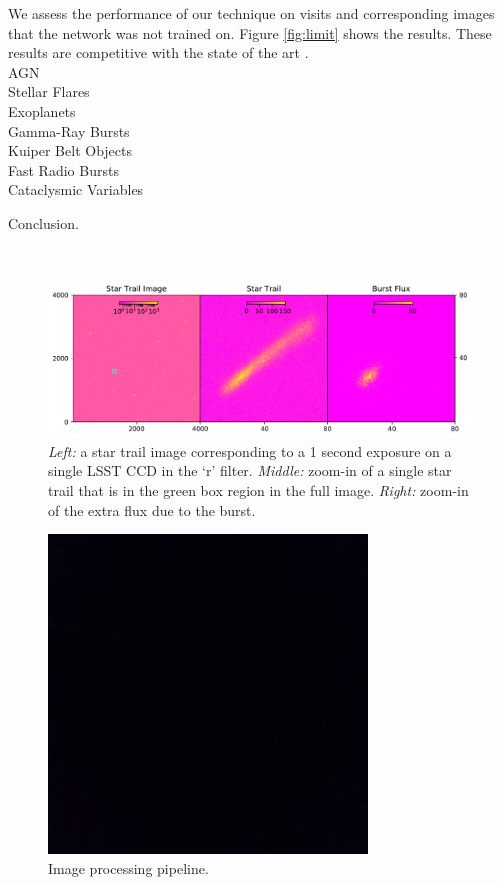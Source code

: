 \documentclass[12pt, letterpaper]{article}
\begin{document}
We assess the performance of our technique on visits and corresponding images that the network was not trained on. Figure \ref{fig:limit} shows the results. These results are competitive with the state of the art \citep{2016SPIE.9908E..0YD}. 
\\

{\color{green}
\noindent AGN\\
Stellar Flares\\
Exoplanets\\
Gamma-Ray Bursts\\
Kuiper Belt Objects\\
Fast Radio Bursts\\
Cataclysmic Variables\\
}

Conclusion.

\
\begin{figure}[htb]
\center
\includegraphics[width=1.00\columnwidth]{star_trail.pdf}
\caption{\textit{Left:} a star trail image corresponding to a 1 second exposure on a single LSST CCD in the `r' filter. \textit{Middle:} zoom-in of a single star trail that is in the green box region in the full image. \textit{Right:} zoom-in of the extra flux due to the burst.}
\label{fig:trail}
\end{figure}

\begin{figure}[htb]
\center
\includegraphics{bbox.jpeg}
\caption{Image processing pipeline.}
\label{fig:pipeline}
\end{figure}
\end{document}
